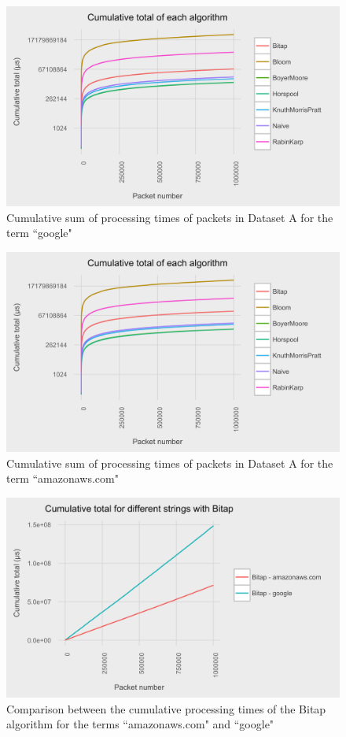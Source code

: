 \documentclass{article}
\begin{document}
\begin{figure}[h!bt]
  \centering
  \includegraphics[width=\textwidth]{graphs/cum_sum_packets_google.png}
  \caption{Cumulative sum of processing times of packets in Dataset A for the term ``google"}
\end{figure}

\begin{figure}[h!bt]
  \centering
  \includegraphics[width=\textwidth]{graphs/cum_sum_packets_amazonaws-com.png}
  \caption{Cumulative sum of processing times of packets in Dataset A for the term ``amazonaws.com"}
\end{figure}

\begin{figure}[h!bt]
  \centering
  \includegraphics[width=\textwidth]{graphs/term_length_compare-bitap.png}
  \caption{Comparison between the cumulative processing times of the Bitap algorithm for the terms ``amazonaws.com" and ``google"}
\end{figure}
\end{document}
